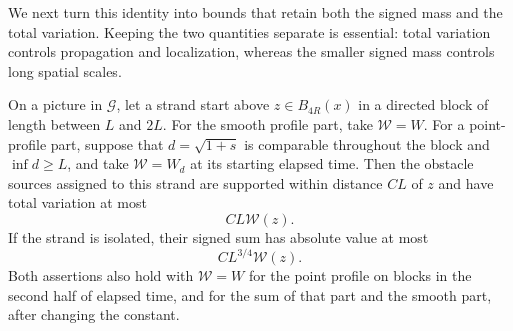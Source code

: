 We next turn this identity into bounds that retain both the signed
mass and the total variation.  Keeping the two quantities separate
is essential: total variation controls propagation and localization,
whereas the smaller signed mass controls long spatial scales.

\begin{lemma}\label{lem:cancellation}
On a picture in $\mathcal G$, let a strand start above
$z\in B_{4R}(x)$ in a directed block of length between $L$ and $2L$.
For the smooth profile part, take $\mathcal W=W$.
For a point-profile part, suppose that $d=\sqrt{1+s}$ is comparable
throughout the block and $\inf d\ge L$, and take $\mathcal W=W_d$
at its starting elapsed time.  Then the obstacle sources assigned
to this strand are supported within distance $CL$ of $z$ and have
total variation at most
\begin{equation}\label{eq:blocksourcevariation}
 CL\mathcal W(z).
\end{equation}
If the strand is isolated, their signed sum has absolute value at most
\begin{equation}\label{eq:blocksourcecancellation}
 CL^{3/4}\mathcal W(z).
\end{equation}
Both assertions also hold with $\mathcal W=W$ for the point profile
on blocks in the second half of elapsed time, and for the sum of that
part and the smooth part, after changing the constant.
\end{lemma}

